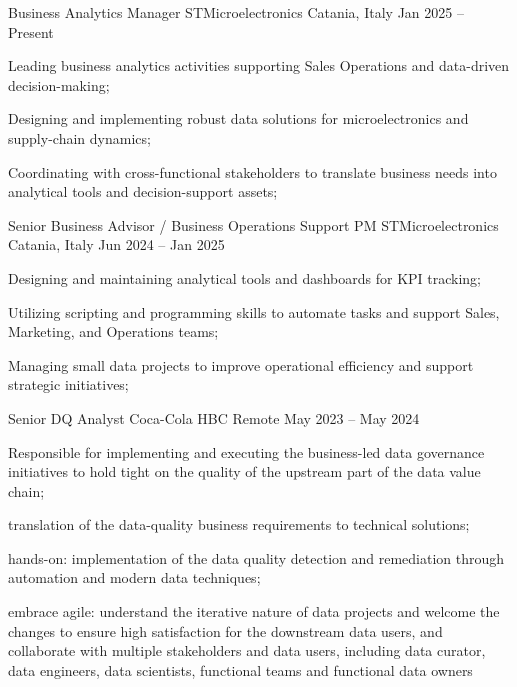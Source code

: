 
  \begin{cventries}
    \cventry
    {Business Analytics Manager}
    {STMicroelectronics}
    {Catania, Italy}
    {Jan 2025 -- Present}
    {
      \begin{cvitems}
        \item {Leading business analytics activities supporting Sales Operations and data-driven decision-making;}
        \item {Designing and implementing robust data solutions for microelectronics and supply-chain dynamics;}
        \item {Coordinating with cross-functional stakeholders to translate business needs into analytical tools and decision-support assets;}
      \end{cvitems}
    }

    \cventry
    {Senior Business Advisor / Business Operations Support PM}
    {STMicroelectronics}
    {Catania, Italy}
    {Jun 2024 -- Jan 2025}
    {
      \begin{cvitems}
        \item {Designing and maintaining analytical tools and dashboards for KPI tracking;}
        \item {Utilizing scripting and programming skills to automate tasks and support Sales, Marketing, and Operations teams;}
        \item {Managing small data projects to improve operational efficiency and support strategic initiatives;}
      \end{cvitems}
    }

    \cventry
    {Senior DQ Analyst}
    {Coca-Cola HBC}
    {Remote}
    {May 2023 -- May 2024}
    {
      \begin{cvitems}
        \item{Responsible for implementing and executing the business-led data governance initiatives
        to hold tight on the quality of the upstream part of the data value chain;}
        \item{translation of the data-quality business requirements to technical solutions;}
        \item{hands-on: implementation of the data quality detection and remediation through automation and modern data techniques;}
        \item{
          embrace agile: understand the iterative nature of data projects and welcome the changes to ensure high satisfaction
          for the downstream data users, and collaborate with multiple stakeholders and data users, including data curator, data engineers,
          data scientists, functional teams and functional data owners
        }
      \end{cvitems}
    }


\end{cventries}
